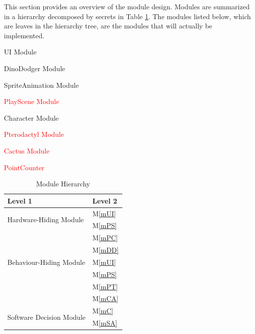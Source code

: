 \documentclass[12pt, titlepage]{article}
\newcounter{mnum}
\newcommand{\mthemnum}{M\themnum}
\newcommand{\mref}[1]{M\ref{#1}}
\begin{document}
This section provides an overview of the module design. Modules are summarized
in a hierarchy decomposed by secrets in Table \ref{TblMH}. The modules listed
below, which are leaves in the hierarchy tree, are the modules that will
actually be implemented.

\begin{description}
\item [ \mthemnum \label{mUI}:] UI Module
\item  [ \mthemnum \label{mDD}:] DinoDodger Module
\item  [ \mthemnum \label{mSA}:] SpriteAnimation Module
\textcolor{red}{\item  [\refstepcounter{mnum} \mthemnum \label{mPS}:] PlayScene Module}
\item  [\refstepcounter{mnum} \mthemnum \label{mC}:] Character Module
\textcolor{red}{
\item  [\refstepcounter{mnum} \mthemnum \label{mPT}:] Pterodactyl Module
\item  [\refstepcounter{mnum} \mthemnum \label{mCA}:] Cactus Module 
\item  [\refstepcounter{mnum} \mthemnum \label{mPC}:]  PointCounter}
\end{description}


\begin{table}[h!]
\centering
\begin{tabular}{p{} p{}}
\toprule
\textbf{Level 1} & \textbf{Level 2}\\
\midrule

\multirow{2}{0.3\textwidth}{Hardware-Hiding Module} 
& \mref{mUI} \\
& \mref{mPS} \\
& \mref{mPC} \\
\midrule

\multirow{3}{0.3\textwidth}{Behaviour-Hiding Module}
 & \mref{mDD}\\
& \mref{mUI} \\
& \mref{mPS} \\
& \mref{mPT} \\
& \mref{mCA} \\
\midrule

\multirow{2}{0.3\textwidth}{Software Decision Module} 
& \mref{mC} \\
& \mref{mSA} \\
\bottomrule

\end{tabular}
\caption{Module Hierarchy}
\label{TblMH}
\end{table}
\end{document}
